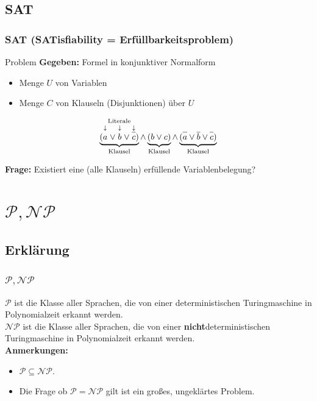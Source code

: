 \subsection{SAT}
\begin{frame}
\frametitle{SAT (SATisfiability = Erfüllbarkeitsproblem)}
\begin{block}{Problem}
\textbf{Gegeben:} Formel in konjunktiver Normalform
\begin{itemize}
 \item Menge $U$ von Variablen
 \item Menge $C$ von Klauseln (Disjunktionen) über $U$
\end{itemize} $$ \underbrace{(\stackrel{\text{Literale}}{\stackrel{\downarrow}{\vphantom{\neglit{a}}a} \vee \stackrel{\downarrow}{\vphantom{\neglit{b}}b} \vee \stackrel{\downarrow}{\neglit{c}}})}_\text{Klausel} \wedge \underbrace{(b \vee c)}_\text{Klausel} \wedge \underbrace{(\neglit{a} \vee \neglit{b} \vee \neglit{c})}_\text{Klausel}$$

\textbf{Frage:} Existiert eine (alle Klauseln) erfüllende Variablenbelegung?
\end{block}
\end{frame}

\section{$\mathcal{P}, \mathcal{NP}$}
\subsection{Erklärung}
\begin{frame}
	\frametitle{$\mathcal{P}, \mathcal{NP}$}
	\ducttape{1cm}
	$\mathcal{P}$ ist die Klasse aller Sprachen, die von einer deterministischen Turingmaschine in Polynomialzeit erkannt werden.\\
	\ducttape{1cm}
	$\mathcal{NP}$ ist die Klasse aller Sprachen, die von einer \textbf{nicht}deterministischen Turingmaschine in Polynomialzeit erkannt werden.\\
	\ducttape{1cm}
	\textbf{Anmerkungen: }
	\begin{itemize}
		\item $\mathcal{P} \subseteq \mathcal{NP}$.
		\item Die Frage ob $\mathcal{P} = \mathcal{NP}$ gilt ist ein großes, ungeklärtes Problem.
	\end{itemize}
	\end{frame}

